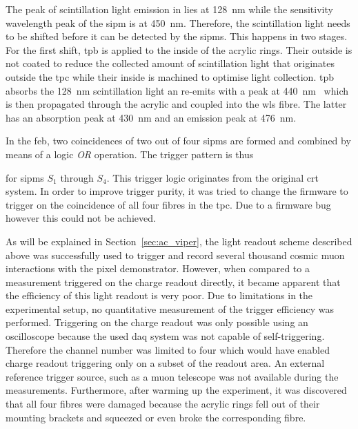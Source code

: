 The peak of scintillation light emission in \lar{} lies at \SI{128}{\nano\metre} while the sensitivity wavelength peak of the \gls{sipm} is at \SI{450}{\nano\metre}.
Therefore, the scintillation light needs to be shifted before it can be detected by the \glspl{sipm}.
This happens in two stages.
For the first shift, \gls{tpb} is applied to the inside of the acrylic rings.
Their outside is not coated to reduce the collected amount of scintillation light that originates outside the \gls{tpc} while their inside is machined to optimise light collection.
\gls{tpb} absorbs the \SI{128}{\nano\metre} scintillation light an re-emits with a peak at \SI{440}{\nano\metre}~\cite{tpb} which is then propagated through the acrylic and coupled into the \gls{wls} fibre.
The latter has an absorption peak at \SI{430}{\nano\metre} and an emission peak at \SI{476}{\nano\metre}.

In the \gls{feb}, two coincidences of two out of four \glspl{sipm} are formed and combined by means of a logic \emph{OR} operation.
The trigger pattern is thus
for \glspl{sipm} $S_1$ through $S_4$.
This trigger logic originates from the original \gls{crt} system.
In order to improve trigger purity, it was tried to change the firmware to trigger on the coincidence of all four fibres in the \gls{tpc}.
Due to a firmware bug however this could not be achieved.

As will be explained in Section~\ref{sec:ac_viper}, the light readout scheme described above was successfully used to trigger and record several thousand cosmic muon interactions with the \AC{} pixel demonstrator.
However, when compared to a measurement triggered on the charge readout directly, it became apparent that the efficiency of this light readout is very poor.
Due to limitations in the experimental setup, no quantitative measurement of the trigger efficiency was performed.
Triggering on the charge readout was only possible using an oscilloscope because the used \gls{daq} system was not capable of self-triggering.
Therefore the channel number was limited to four which would have enabled charge readout triggering only on a subset of the readout area.
An external reference trigger source, such as a muon telescope was not available during the measurements.
Furthermore, after warming up the experiment, it was discovered that all four fibres were damaged because the acrylic rings fell out of their mounting brackets and squeezed or even broke the corresponding fibre.

